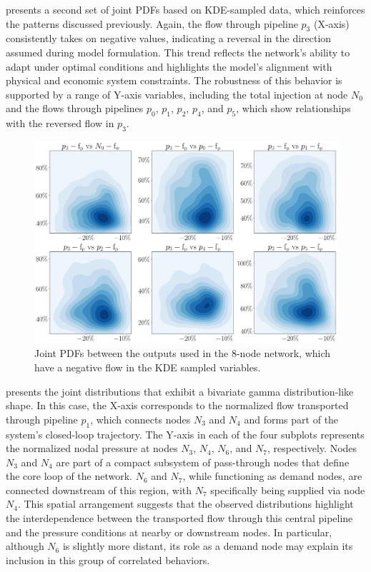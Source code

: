  presents a second set of joint PDFs based on KDE-sampled data, which reinforces the patterns discussed previously. Again, the flow through pipeline $p_3$ (X-axis) consistently takes on negative values, indicating a reversal in the direction assumed during model formulation. This trend reflects the network’s ability to adapt under optimal conditions and highlights the model’s alignment with physical and economic system constraints. The robustness of this behavior is supported by a range of Y-axis variables, including the total injection at node $N_0$ and the flows through pipelines $p_0$, $p_1$, $p_2$, $p_4$, and $p_5$, which show relationships with the reversed flow in $p_3$.



\begin{figure}[H]
    \begin{center}
        \includegraphics[width=.8\textwidth]{figures/Chapter_NonLinealCensnet/outputs_outputs_2 (KDE).png}
    \end{center}
    \caption{Joint PDFs between the outputs used in the 8-node network, which have a negative flow in the KDE sampled variables.}
    \label{fig:joint_distributions_output_output_2_KDE}
\end{figure}
 


 presents the joint distributions that exhibit a bivariate gamma distribution-like shape. In this case, the X-axis corresponds to the normalized flow transported through pipeline $p_1$, which connects nodes $N_3$ and $N_4$ and forms part of the system’s closed-loop trajectory. The Y-axis in each of the four subplots represents the normalized nodal pressure at nodes $N_3$, $N_4$, $N_6$, and $N_7$, respectively. Nodes $N_3$ and $N_4$ are part of a compact subsystem of pass-through nodes that define the core loop of the network. $N_6$ and $N_7$, while functioning as demand nodes, are connected downstream of this region, with $N_7$ specifically being supplied via node $N_4$. This spatial arrangement suggests that the observed distributions highlight the interdependence between the transported flow through this central pipeline and the pressure conditions at nearby or downstream nodes. In particular, although $N_6$ is slightly more distant, its role as a demand node may explain its inclusion in this group of correlated behaviors.


